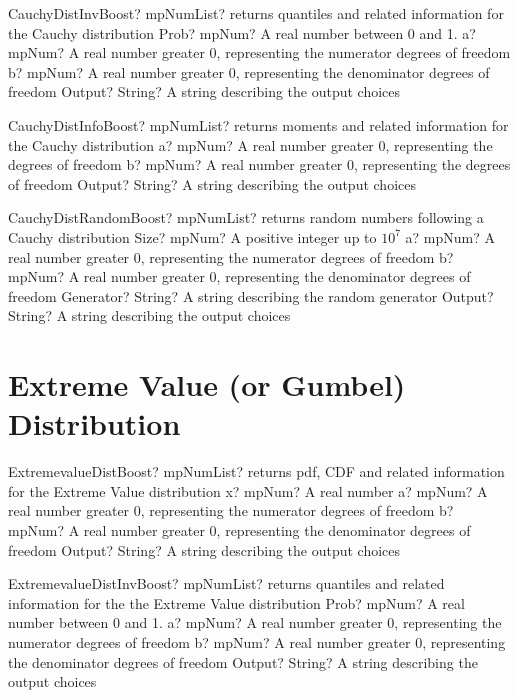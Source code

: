 \documentclass[12pt,a4paper,openany]{book}
\begin{document}
\begin{mpFunctionsExtract}
\mpFunctionFour
{CauchyDistInvBoost? mpNumList? returns quantiles and related information for the Cauchy distribution}
{Prob? mpNum? A real number between 0 and 1.}
{a? mpNum? A real number greater 0, representing the numerator  degrees of freedom}
{b? mpNum? A real number greater 0, representing the denominator degrees of freedom}
{Output? String? A string describing the output choices}
\end{mpFunctionsExtract}

\begin{mpFunctionsExtract}
\mpFunctionThree
{CauchyDistInfoBoost? mpNumList? returns moments and related information for the Cauchy distribution}
{a? mpNum? A real number greater 0, representing the degrees of freedom}
{b? mpNum? A real number greater 0, representing the degrees of freedom}
{Output? String? A string describing the output choices}
\end{mpFunctionsExtract}

\begin{mpFunctionsExtract}
\mpFunctionFive
{CauchyDistRandomBoost? mpNumList? returns random numbers following a Cauchy distribution}
{Size? mpNum? A positive integer up to $10^7$}
{a? mpNum? A real number greater 0, representing the numerator  degrees of freedom}
{b? mpNum? A real number greater 0, representing the denominator degrees of freedom}
{Generator? String? A string describing the random generator}
{Output? String? A string describing the output choices}
\end{mpFunctionsExtract}

\section{Extreme Value (or Gumbel) Distribution}

\begin{mpFunctionsExtract}
\mpFunctionFour
{ExtremevalueDistBoost? mpNumList? returns pdf, CDF and related information for the Extreme Value distribution}
{x? mpNum? A real number}
{a? mpNum? A real number greater 0, representing the numerator  degrees of freedom}
{b? mpNum? A real number greater 0, representing the denominator degrees of freedom}
{Output? String? A string describing the output choices}
\end{mpFunctionsExtract}

\begin{mpFunctionsExtract}
\mpFunctionFour
{ExtremevalueDistInvBoost? mpNumList? returns quantiles and related information for the the Extreme Value distribution}
{Prob? mpNum? A real number between 0 and 1.}
{a? mpNum? A real number greater 0, representing the numerator  degrees of freedom}
{b? mpNum? A real number greater 0, representing the denominator degrees of freedom}
{Output? String? A string describing the output choices}
\end{mpFunctionsExtract}
\end{document}
